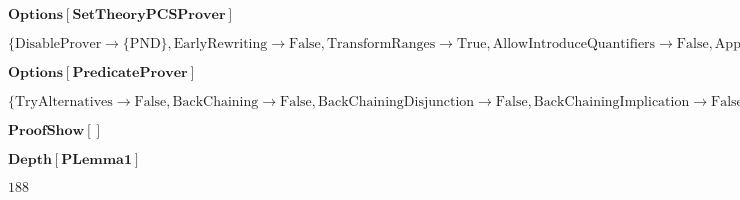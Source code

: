 \documentclass{article}
\begin{document}
\noindent\(\pmb{\text{Options}[\text{SetTheoryPCSProver}]}\)

\noindent\(\{\text{DisableProver}\to \{\text{PND}\},\text{EarlyRewriting}\to \text{False},\text{TransformRanges}\to \text{True},\text{AllowIntroduceQuantifiers}\to
\text{False},\text{ApplyBuiltIns}\to \text{True},\text{BackChaining}\to \text{False},\text{BackChainingDisjunction}\to \text{False},\text{BackChainingEquivalence}\to
\text{False},\text{BackChainingImplication}\to \text{False},\text{ChooseFromFiniteSet}\to \text{False},\text{DisableInferenceRule}\to \{\text{KBComposeIntersection},\text{KBFiniteChoice},\text{KBInferNonEmpty}\},\text{EarlyCaseDistinction}\to
\text{True},\text{GRWTarget}\to \{\text{kb},\text{goal}\},\text{InferMembershipIntersection}\to \text{False},\text{KBRWOnlySimplification}\to \text{False},\text{MatchExistential}\to
\text{TryAllAtOnce},\text{ModusPonensException}\to \text{None},\text{ModusPonensKB}\to \text{True},\text{PNDLevel}\to 1,\text{RWBooleanLiteralCombinations}\to
\text{True},\text{RWCombine}\to \text{False},\text{RWExistentialGoal}\to \text{False},\text{RWHigherOrder}\to \text{False},\text{RWInnermost}\to
\text{True},\text{RWInsideQuantifiers}\to \text{False},\text{RWSetOperators}\to \text{False},\text{RWTuples}\to \text{True},\text{SemanticMatch}\to
\text{True},\text{SimplifyFormula}\to \text{False},\text{STPFunctionProperties}\to \text{True},\text{STPLevel}\to 100,\text{STPMembershipByInclusion}\to
\text{False},\text{TryAlternatives}\to \text{False},\text{TrySubgoal}\to \text{False},\text{TrySubgoalDisjunction}\to \text{False},\text{TrySubgoalEquivalence}\to
\text{False},\text{TrySubgoalImplication}\to \text{False},\text{UseCyclicRules}\to \text{False},\text{UseEqualitiesFirst}\to \text{True},\text{UseNonMembership}\to
\text{True}\}\)

\noindent\(\pmb{\text{Options}[\text{PredicateProver}]}\)

\noindent\(\{\text{TryAlternatives}\to \text{False},\text{BackChaining}\to \text{False},\text{BackChainingDisjunction}\to \text{False},\text{BackChainingImplication}\to
\text{False},\text{BackChainingEquivalence}\to \text{False},\text{TrySubgoalDisjunction}\to \text{False},\text{TrySubgoalImplication}\to \text{False},\text{TrySubgoalEquivalence}\to
\text{False},\text{TrySubgoal}\to \text{False},\text{PNDLevel}\to 1\}\)

\noindent\(\pmb{\text{ProofShow}[]}\)

\noindent\(\pmb{\text{Depth}[\text{PLemma1}]}\)

\noindent\(188\)
\end{document}
